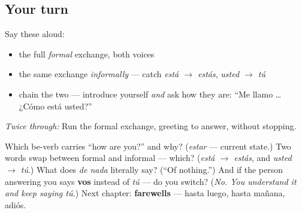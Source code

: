 \subsection*{Your turn}
Say these aloud:

\begin{itemize}
\raggedright
  \item the full \emph{formal} exchange, both voices
  \item the same exchange \emph{informally} — catch \emph{está $\to$ estás}, \emph{usted $\to$ tú}
  \item chain the two — introduce yourself \emph{and} ask how they are: \textquotedblleft{}Me llamo … ¿Cómo está usted?\textquotedblright{}
\end{itemize}

\emph{Twice through:} Run the formal exchange, greeting to answer, without stopping.

\begin{tcolorbox}[breakable,colback=teal!4,colframe=teal!35!black,title={Before you move on}]
Which be-verb carries \textquotedblleft{}how are you?\textquotedblright{} and why? (\emph{estar} — current state.) Two words swap between formal and informal — which? (\emph{está $\to$ estás}, and \emph{usted $\to$ tú}.) What does \emph{de nada} literally say? (\textquotedblleft{}Of nothing.\textquotedblright{}) And if the person answering you says \textbf{vos} instead of \emph{tú} — do you switch? (\emph{No. You understand it and keep saying tú.}) Next chapter: \textbf{farewells} — hasta luego, hasta mañana, adiós.
\end{tcolorbox}
